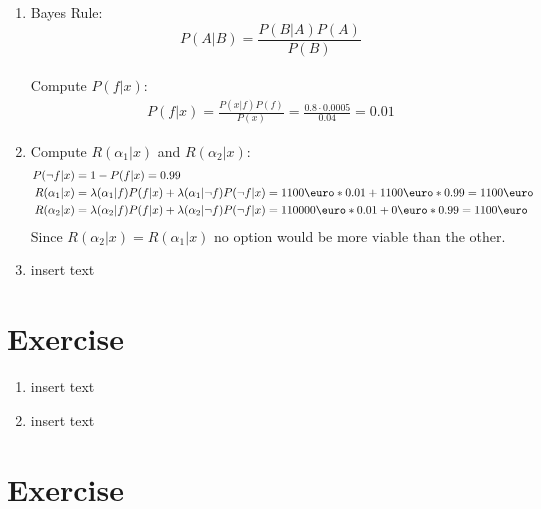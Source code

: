 \documentclass[a4paper]{article}
\begin{document}
		\begin{enumerate}[label={(\alph*)}]
		\item				
				Bayes Rule: $$ P(A|B)=\frac{P(B|A)P(A)}{P(B)}$$\\
				Compute	$P(f|x)$: 
				\begin{align*}
					P(f|x) = \frac{P(x|f)P(f)}{P(x)} = \frac{0.8 \cdot 0.0005}{0.04} = 0.01
				\end{align*}
		\item 
		Compute $R(\alpha_1|x)$ and $R(\alpha_2|x)$:\\
		\begin{align*}
		    P(\neg f|x) &= 1 - P(f|x) = 0.99\\
			R(\alpha_1|x) &= \lambda(\alpha_1|f)P(f|x) + \lambda(\alpha_1|\neg f)P(\neg f|x) = 1100\text{\euro} * 0.01 + 1100\text{\euro} * 0.99 = 1100\text{\euro}\\
			R(\alpha_2|x) &= \lambda(\alpha_2|f)P(f|x) + \lambda(\alpha_2|\neg f)P(\neg f|x) = 110000\text{\euro} * 0.01 + 0\text{\euro} * 0.99 = 1100\text{\euro}
		\end{align*}
		Since $R(\alpha_2|x)=R(\alpha_1|x)$ no option would be more viable than the other.
		\item insert text
	\end{enumerate}
	\section{Exercise}
		\begin{enumerate}[label={(\alph*)}]
			\item insert text
			\item insert text
		\end{enumerate}
	\section{Exercise}
	
\end{document}
